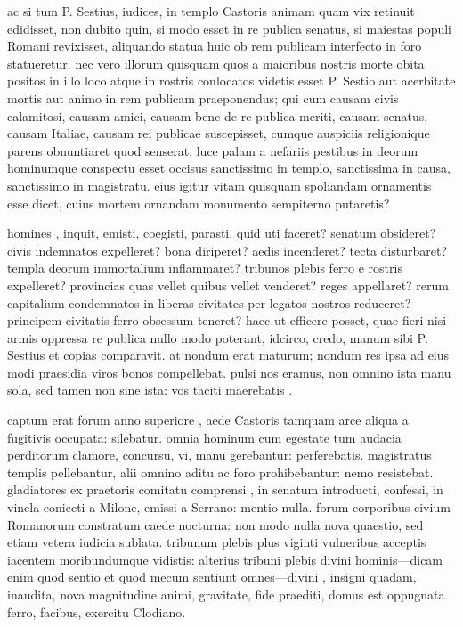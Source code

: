  ac si tum P. Sestius, iudices, in templo Castoris animam quam vix retinuit edidisset, non dubito quin, si modo esset in re publica senatus, si maiestas populi Romani revixisset, aliquando statua huic ob rem publicam interfecto in foro statueretur. nec vero illorum quisquam quos a maioribus nostris morte obita positos in illo loco atque in rostris conlocatos videtis esset P. Sestio aut acerbitate mortis aut animo in rem publicam praeponendus; qui cum causam civis calamitosi, causam amici, causam bene de re publica meriti, causam senatus, causam Italiae, causam rei publicae suscepisset, cumque auspiciis religionique parens obnuntiaret quod senserat, luce palam a nefariis pestibus in deorum hominumque conspectu esset occisus sanctissimo in templo, sanctissima in causa, sanctissimo in magistratu. eius igitur vitam quisquam spoliandam ornamentis esse dicet, cuius mortem ornandam monumento sempiterno putaretis?

 homines , inquit, emisti, coegisti, parasti. quid uti faceret? senatum obsideret? civis indemnatos expelleret? bona diriperet? aedis incenderet? tecta disturbaret? templa deorum immortalium inflammaret? tribunos plebis ferro e rostris expelleret? provincias quas vellet quibus vellet venderet? reges appellaret? rerum capitalium condemnatos in liberas civitates per legatos nostros reduceret? principem civitatis ferro obsessum teneret? haec ut efficere posset, quae fieri nisi armis oppressa re publica nullo modo poterant, idcirco, credo, manum sibi P. Sestius et copias comparavit. at nondum erat maturum; nondum res ipsa ad eius modi praesidia viros bonos compellebat. pulsi nos eramus, non omnino ista manu sola, sed tamen non sine ista: vos taciti maerebatis .

 captum erat forum anno superiore , aede Castoris tamquam arce aliqua a fugitivis occupata: silebatur. omnia hominum cum egestate tum audacia perditorum clamore, concursu, vi, manu gerebantur: perferebatis. magistratus templis pellebantur, alii omnino aditu ac foro prohibebantur: nemo resistebat. gladiatores ex praetoris comitatu comprensi , in senatum introducti, confessi, in vincla coniecti a Milone, emissi a Serrano: mentio nulla. forum corporibus civium Romanorum constratum caede nocturna: non modo nulla nova quaestio, sed etiam vetera iudicia sublata. tribunum plebis plus viginti vulneribus acceptis iacentem moribundumque vidistis: alterius tribuni plebis divini hominis—dicam enim quod sentio et quod mecum sentiunt omnes—divini , insigni quadam, inaudita, nova magnitudine animi, gravitate, fide praediti, domus est oppugnata ferro, facibus, exercitu Clodiano.

